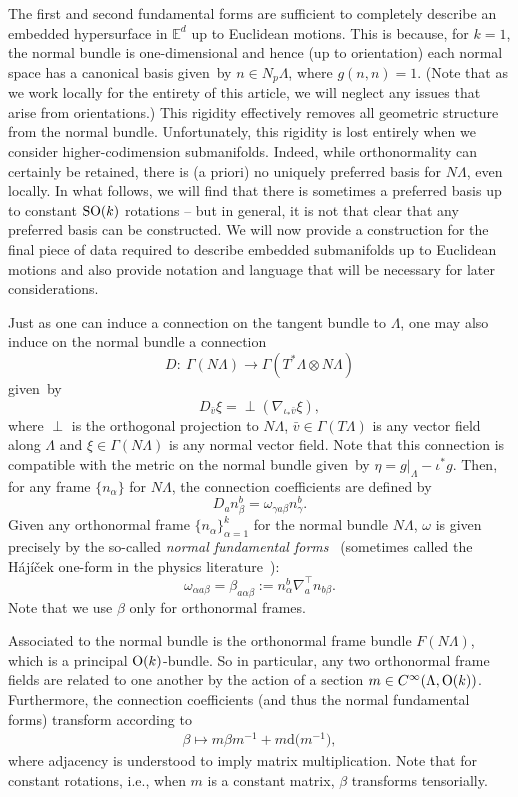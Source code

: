 The first and second fundamental forms are sufficient to completely describe an embedded hypersurface in $\mathbb{E}^d$ up to Euclidean motions. This is because, for $k=1$, the normal bundle is one-dimensional and hence (up to orientation) each normal space has a canonical basis given~by $n \in N_p \Lambda$, where $g(n,n) = 1$. (Note that as we work locally for the entirety of this article, we will neglect any issues that arise from orientations.) This rigidity effectively removes all geometric structure from the normal bundle. Unfortunately, this rigidity is lost entirely when we consider higher-codimension submanifolds. Indeed, while orthonormality can certainly be retained, there is (a priori) no uniquely preferred basis for $N \Lambda$, even locally. In what follows, we will find that there is sometimes a preferred basis up to constant ${\rm SO}(k)$ rotations -- but in general, it is not that clear that any preferred basis can be constructed. We will now provide a construction for the final piece of data required to describe embedded submanifolds up to Euclidean motions and also provide notation and language that will be necessary for later considerations.

Just as one can induce a connection on the tangent bundle to $\Lambda$, one may also induce on the normal bundle a connection
\[
D \colon \ \Gamma(N \Lambda) \rightarrow \Gamma(T^* \Lambda \otimes N \Lambda)
\]
given~by
\[
D_{\bar v} \xi = {\perp} (\nabla_{\iota_* \bar{v}} \xi) ,
\]
where $\perp$ is the orthogonal projection to $N \Lambda$, $\bar{v} \in \Gamma(T \Lambda)$ is any vector field along $\Lambda$ and $\xi \in \Gamma(N \Lambda)$ is any normal vector field. Note that this connection is compatible with the metric on the normal bundle given~by $\eta = g|_{\Lambda} - \iota^* g$. Then, for any frame $\{n_{\alpha}\}$ for $N \Lambda$, the connection coefficients are defined by
\[
D_a n^b_{\beta} = \omega_{\gamma a \beta} n^b_{\gamma} .
\]
Given any orthonormal frame $\{n_{\alpha}\}_{\alpha = 1}^k$ for the normal bundle $N \Lambda$, $\omega$ is given precisely by the so-called \textit{normal fundamental forms}~\cite{Spivak} (sometimes called the H{\'a}j{\'i}{\v{c}}ek one-form in the physics literature~\cite{hajicek1975, hajicek1973}):
\[
\omega_{\alpha a \beta} = \beta_{a \alpha \beta} := n^b_{\alpha} \nabla^\top_a n_{b \beta} .
\]
Note that we use $\beta$ only for orthonormal frames.

Associated to the normal bundle is the orthonormal frame bundle $F(N \Lambda)$, which is a principal ${\rm O}(k)$-bundle. So in particular, any two orthonormal frame fields are related to one another by the action of a section $m \in C^\infty(\Lambda, {\rm O}(k))$. Furthermore, the connection coefficients (and thus the normal fundamental forms) transform according to
\begin{align} \label{beta-transf}
\beta \mapsto m \beta m^{-1} + m \mathrm{d} \bigl(m^{-1}\bigr) ,
\end{align}
where adjacency is understood to imply matrix multiplication.
Note that for constant rotations, i.e., when $m$ is a constant matrix, $\beta$ transforms tensorially.

